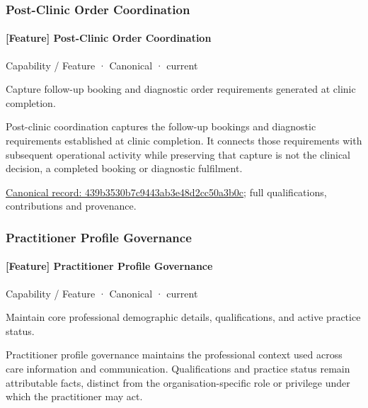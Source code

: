\subsubsection{Post-Clinic Order Coordination}

\paragraph{[Feature] Post-Clinic Order Coordination}

\label{element:439b3530b7c9443ab3e48d2cc50a3b0c}
{\small Capability / Feature · Canonical · current}\par

Capture follow-up booking and diagnostic order requirements generated at clinic completion.



Post-clinic coordination captures the follow-up bookings and diagnostic requirements established at clinic completion. It connects those requirements with subsequent operational activity while preserving that capture is not the clinical decision, a completed booking or diagnostic fulfilment.


{\footnotesize \href{../../../../continuum/strategy/capability/feature/439b3530b7c9443ab3e48d2cc50a3b0c.md}{Canonical record: 439b3530b7c9443ab3e48d2cc50a3b0c}; full qualifications, contributions and provenance.}\par
\subsubsection{Practitioner Profile Governance}

\paragraph{[Feature] Practitioner Profile Governance}

\label{element:d23be319c6114c28bcb9e24e1258a0fc}
{\small Capability / Feature · Canonical · current}\par

Maintain core professional demographic details, qualifications, and active practice status.



Practitioner profile governance maintains the professional context used across care information and communication. Qualifications and practice status remain attributable facts, distinct from the organisation-specific role or privilege under which the practitioner may act.


